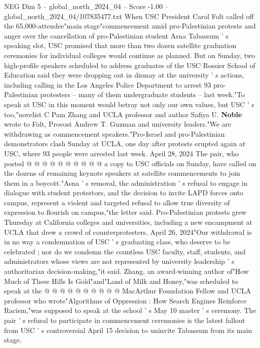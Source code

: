 \begin{textsample}{NEG Dim 5 – global\_north\_2024\_04 – Score -1.00 – global\_north\_2024\_04/107835477.txt}  \label{ex:f5_neg_199}
When USC President Carol Folt called off the 65,000-attendee"main stage"commencement amid pro-Palestinian protests and anger over the cancellation of pro-Palestinian student Asna Tabassum ' s speaking slot, USC promised that more than two dozen satellite graduation ceremonies for individual colleges would continue as planned.
But on Sunday, two high-profile speakers scheduled to address graduates of the USC Rossier School of Education said they were dropping out in dismay at the university ' s actions, including calling in the Los Angeles Police Department to arrest 93 pro-Palestinian protesters -- many of them undergraduate students -- last week."To speak at USC in this moment would betray not only our own values, but USC ' s too,"novelist C Pam Zhang and UCLA professor and author Safiya U. \textbf{Noble} wrote to Folt, Provost Andrew T.
Guzman and university leaders."We are withdrawing as commencement speakers."Pro-Israel and pro-Palestinian demonstrators clash Sunday at UCLA, one day after protests erupted again at USC, where 93 people were arrested last week.
April 28, 2024 The pair, who posted @ @ @ @ @ @ @ @ @ @ a copy to USC officials on Sunday, have called on the dozens of remaining keynote speakers at satellite commencements to join them in a boycott."Asna ' s removal, the administration ' s refusal to engage in dialogue with student protestors, and the decision to invite LAPD forces onto campus, represent a violent and targeted refusal to allow true diversity of expression to flourish on campus,"the letter said.
Pro-Palestinian protests grew Thursday at California colleges and universities, including a new encampment at UCLA that drew a crowd of counterprotesters.
April 26, 2024"Our withdrawal is in no way a condemnation of USC ' s graduating class, who deserve to be celebrated ; nor do we condemn the countless USC faculty, staff, students, and administrators whose views are not represented by university leadership ' s authoritarian decision-making,"it said.
Zhang, an award-winning author of"How Much of These Hills Is Gold"and"Land of Milk and Honey,"was scheduled to speak at the @ @ @ @ @ @ @ @ @ @ MacArthur Foundation Fellow and UCLA professor who wrote"Algorithms of Oppression : How Search Engines Reinforce Racism,"was supposed to speak at the school ' s May 10 master ' s ceremony.
The pair ' s refusal to participate in commencement ceremonies is the latest fallout from USC ' s controversial April 15 decision to uninvite Tabassum from its main stage.

\end{textsample}
